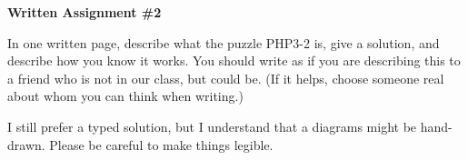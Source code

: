\documentclass[12pt,letterpaper]{article}
\begin{document}
\setlength{\parskip}{1ex plus 0.5ex minus 0.2ex}
\setlength{\parindent}{0pt}

\pagestyle{fancy}
\lfoot{} 
\rfoot{} 

\begin{center}
{
\Large
\textbf{Written Assignment \#2}
}
\end{center}

In one written page, describe what the puzzle PHP3-2 is, give a solution, and describe how you know it works.
You should write as if you are describing this to a friend who is not in our class, but could be. 
(If it helps, choose someone real about whom you can think when writing.)

I still prefer a typed solution, but I understand that a diagrams might be hand-drawn. Please be careful to make things legible.

\clearpage
\end{document}
